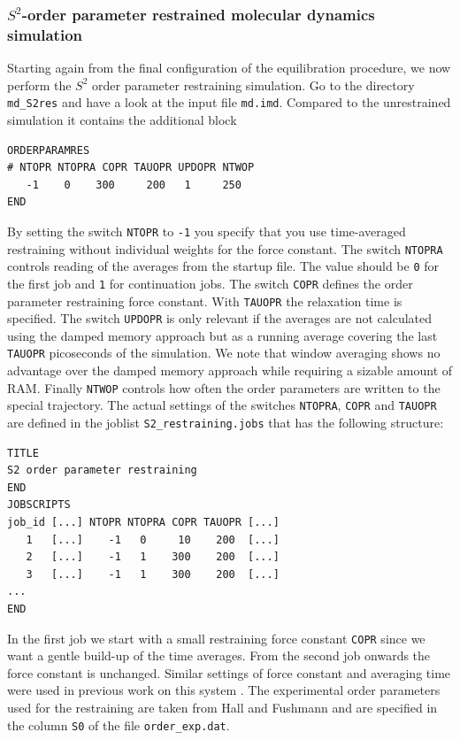 \subsubsection{$S^2$-order parameter restrained molecular dynamics simulation}

Starting again from the final configuration of the equilibration procedure, we now perform the $S^2$ order parameter restraining simulation. Go to the directory \texttt{md\_S2res} and have a look at the input file \texttt{md.imd}. 
Compared to the unrestrained simulation it contains the additional block 

\begin{lstlisting}
ORDERPARAMRES
# NTOPR NTOPRA COPR TAUOPR UPDOPR NTWOP
   -1    0    300     200   1     250
END
\end{lstlisting}
By setting the switch \texttt{NTOPR} to \texttt{-1} you specify that you use time-averaged restraining without individual weights for the force constant. The switch \texttt{NTOPRA} controls reading of the 
averages from the startup file. The value should be \texttt{0} for the first job and \texttt{1} for continuation jobs. The switch \texttt{COPR} defines the order parameter restraining force constant. With 
\texttt{TAUOPR} the relaxation time is specified. The switch \texttt{UPDOPR} is only relevant if the averages are not calculated using the damped memory approach but as a running average covering the 
last \texttt{TAUOPR} picoseconds of the simulation. We note that window averaging shows no advantage over the damped memory approach while requiring a sizable amount of RAM. Finally \texttt{NTWOP}
controls how often the order parameters are written to the special trajectory. 
The actual settings of the switches \texttt{NTOPRA}, \texttt{COPR} and \texttt{TAUOPR} are defined in the joblist \texttt{S2\_restraining.jobs} that has the following structure: 
\begin{lstlisting}
TITLE
S2 order parameter restraining
END
JOBSCRIPTS
job_id [...] NTOPR NTOPRA COPR TAUOPR [...]
   1   [...]    -1   0     10    200  [...]   
   2   [...]    -1   1    300    200  [...] 
   3   [...]    -1   1    300    200  [...] 
... 
END
\end{lstlisting}
In the first job we start with a small restraining force constant \texttt{COPR} since we want a gentle build-up of the time averages. From the second job onwards the force constant is unchanged. Similar settings of force constant and averaging time were used in previous work on this system \cite{Hansen_S2_2014}.
The experimental order parameters used for the restraining are taken from Hall and Fushmann \cite{Hall_2003} and are specified in the column \texttt{S0} of the file \texttt{order\_exp.dat}.
